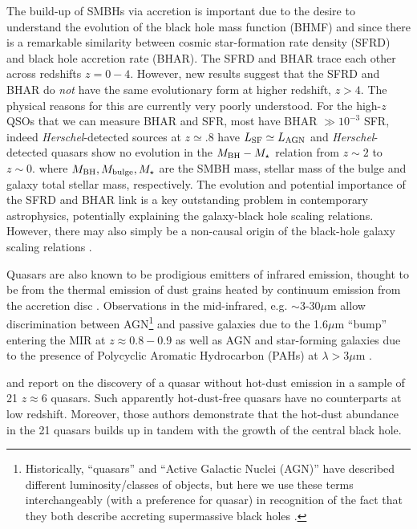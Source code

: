 \documentclass[usenatbib]{mnras}
\begin{document}
The build-up of SMBHs via accretion is important due to the desire to
understand the evolution of the black hole mass function (BHMF) and
since there is a remarkable similarity between cosmic star-formation
rate density (SFRD) and black hole accretion rate (BHAR). The SFRD and
BHAR trace each other \citep[with a normalisation factor of
$\sim3000$,][]{Willott2013b, MadauDickinson2014} across redshifts
$z=0-4$.  However, new results \citep[e.g., ][]{Vito2018a, Calhau2018}
suggest that the SFRD and BHAR do {\it not} have the same evolutionary form
at higher redshift, $z>4$. The physical reasons for this are currently very poorly
understood.  For the high-$z$ QSOs that we can measure BHAR and SFR, most
have BHAR $\gg 10^{-3}$ SFR, indeed {\it Herschel}-detected sources at
$z\simeq.8$ have $L_{\rm SF} \simeq L_{\rm AGN}$ \citep[e.g.,
][]{Netzer2014} and {\it Herschel}-detected quasars show no evolution
in the $M_{\rm BH} - M_{\star}$ relation from $z\sim2$ to $z\sim0$.
where $M_{\rm BH}, M_{\rm bulge}, M_{\star}$ are the SMBH mass,
stellar mass of the bulge and galaxy total stellar mass,
respectively. The evolution and potential importance of the SFRD and BHAR 
link is a key outstanding problem in contemporary astrophysics, 
potentially explaining the galaxy-black hole scaling relations. 
However, there may also simply be a non-causal origin of the black-hole 
galaxy scaling relations \citep{Jahnke2011}.

Quasars are also known to be prodigious emitters of infrared emission,
thought to be from the thermal emission of dust grains heated by
continuum emission from the accretion disc \citep[][]{Hill2014,
Hickox2017}.  Observations in the mid-infrared, e.g. $\sim$3-30$\mu$m
allow discrimination between AGN\footnote{Historically, ``quasars'' and
``Active Galactic Nuclei (AGN)'' have described different
luminosity/classes of objects, but here we use these terms
interchangeably (with a preference for quasar) in recognition of the
fact that they both describe accreting supermassive black holes
\citep[e.g.][]{Haardt2016book}.}  and passive galaxies due to the
1.6$\mu$m ``bump'' entering the MIR at $z\approx0.8-0.9$ \citep[e.g.,
][]{Wright1994, Sawicki2002, Lacy2004, Stern2005, Richards2006b,
Timlin2016} as well as AGN and star-forming galaxies due to the
presence of Polycyclic Aromatic Hydrocarbon (PAHs) at $\lambda >3\mu$m
\citep[e.g., ][]{Yan2007, Tielens2008}.

\citet{Jiang2006dust} and \citet{Jiang2010} report on the discovery of
a quasar without hot-dust emission in a sample of 21 $z\approx6$
quasars. Such apparently hot-dust-free quasars have no counterparts at
low redshift. Moreover, those authors demonstrate that the hot-dust
abundance in the 21 quasars builds up in tandem with the growth of the
central black hole.
\end{document}
